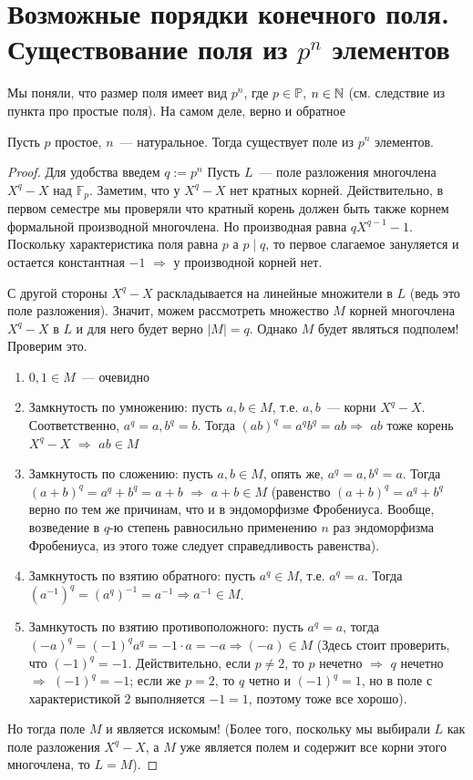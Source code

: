 \section{Возможные порядки конечного поля. Существование поля из $p^n$ элементов}
Мы поняли, что размер поля имеет вид $p^n$, где $p\in\mathbb{P}$, $n\in \mathbb{N}$ (см. следствие из пункта про простые поля).
На самом деле, верно и обратное
\begin{theorem-non}
    Пусть $p$ простое, $n$~--- натуральное.
    Тогда существует поле из $p^n$ элементов.
\end{theorem-non}
\begin{proof}
    Для удобства введем $q := p^n$
    Пусть $L$~--- поле разложения многочлена $X^q-X$ над $\mathbb{F}_p$.
    Заметим, что у $X^q-X$ нет кратных корней.
    Действительно, в первом семестре мы проверяли что кратный корень должен быть также корнем формальной производной многочлена.
    Но производная равна $qX^{q-1}-1$.
    Поскольку характеристика поля равна $p$ а $p\mid q$, то первое слагаемое зануляется и остается константная $-1$ $\Rightarrow$ у производной корней нет.

    С другой стороны $X^q-X$ раскладывается на линейные множители в $L$ (ведь это поле разложения).
    Значит, можем рассмотреть множество $M$ корней многочлена $X^q-X$ в $L$ и для него будет верно $|M|=q$.
    Однако $M$ будет являться подполем!
    Проверим это.
    \begin{enumerate}
        \item $0,1\in M$~--- очевидно
        \item Замкнутость по умножению: пусть $a, b\in M$, т.е. $a,b$~--- корни $X^q-X$.
        Соответственно, $a^q=a, b^q=b$.
        Тогда $(ab)^q=a^q b^q = ab \Rightarrow$ $ab$ тоже корень $X^q-X$ $\Rightarrow$ $ab\in M$
        \item Замкнутость по сложению: пусть $a, b\in M$, опять же, $a^q=a, b^q=a$.
        Тогда $(a+b)^q = a^q + b^q = a + b$ $\Rightarrow$ $a+b \in M$ (равенство $(a+b)^q = a^q+b^q$ верно по тем же причинам, что и в эндоморфизме Фробениуса. Вообще, возведение в $q$-ю степень равносильно применению $n$ раз эндоморфизма Фробениуса, из этого тоже следует справедливость равенства).
        \item Замкнутость по взятию обратного: пусть $a^q \in M$, т.е. $a^q=a$. Тогда $(a^{-1})^q = (a^q)^{-1}=a^{-1} \Rightarrow a^{-1} \in M$.
        \item Замнкутость по взятию противоположного: пусть $a^q=a$, тогда $(-a)^q = (-1)^q a^q = -1 \cdot a = -a \Rightarrow (-a) \in M$  (Здесь стоит проверить, что $(-1)^q=-1$. Действительно, если $p\neq 2$, то $p$ нечетно $\Rightarrow$ $q$ нечетно $\Rightarrow$ $(-1)^q = -1$; если же $p = 2$, то $q$ четно и $(-1)^q=1$, но в поле с характеристикой $2$ выполняется $-1=1$, поэтому тоже все хорошо).
    \end{enumerate}\medskip

    Но тогда поле $M$ и является искомым!
    (Более того, поскольку мы выбирали $L$ как поле разложения $X^q-X$, а $M$ уже является полем и содержит все корни этого многочлена, то $L=M$).
\end{proof}